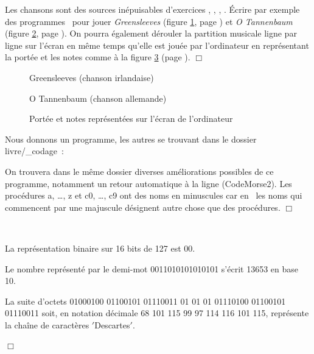\begin{exercice}{Les chansons sont des sources inépuisables d'exercices
 \cite{boutet}, \cite{sabatier1}, \cite{sabatier2}, \cite{sabatier3}. 
 Écrire par exemple des programmes 
\ocaml\  pour jouer {\em Green\-sleeves\/} (figure \ref{fig:Greensleeves}, page \pageref{fig:Greensleeves})
et {\em O Tannenbaum\/} (figure \ref{fig:Tannenbaum}, page \pageref{fig:Tannenbaum}).
On pourra également dérouler la partition musicale ligne par ligne sur l'écran 
en même temps qu'elle est jouée par l'ordinateur en re\-pré\-sen\-tant la portée
et les notes comme  à la figure \ref{fig:RepNotes} (page \pageref{fig:RepNotes}).
\noindent $\Box$}\end{exercice}
\begin{figure}[htbp]
 
 \caption{Greensleeves (chanson irlandaise)}\label{fig:Greensleeves}
\end{figure}
\begin{figure}[htbp]
 
 \caption{O Tannenbaum  (chanson allemande)}\label{fig:Tannenbaum}
\end{figure}
\begin{figure}[htbp]
 \caption{Portée et notes représentées sur l'écran de l'ordinateur}\label{fig:RepNotes}
\end{figure}
\begin{corrige}{
Nous donnons un programme, les autres se trouvant dans le dossier {\idt livre/\_codage}~:


On trouvera dans le même dossier diverses améliorations possibles de ce programme, notamment
un retour automatique à la ligne ({\idt CodeMorse2}).
Les procédures {\idt a}, \ldots, {\idt z} et {\idt c0}, \ldots, {\idt c9} ont des noms 
en minuscules car en \ocaml\ les noms qui commencent par une majuscule désignent autre chose 
que des procédures.
\noindent $\Box$}\end{corrige}
\begin{corriges}{\ \\
\vspace{-\baselineskip}

\tiret La représentation binaire sur 16 bits de 127 est 
00.

\tiret Le nombre représenté par le demi-mot 0011010101010101 s'écrit
13653 en base 10.

\tiret La suite d'octets 01000100 01100101 01110011 01 01
01 01110100 01100101 01110011
soit, en notation décimale 68 101 115 99 97 114 116 101 115,
représente la chaîne de caractères
{\cha $\scriptstyle '$Descartes\idt $\scriptstyle '$}.

\noindent $\Box$}\end{corriges}

